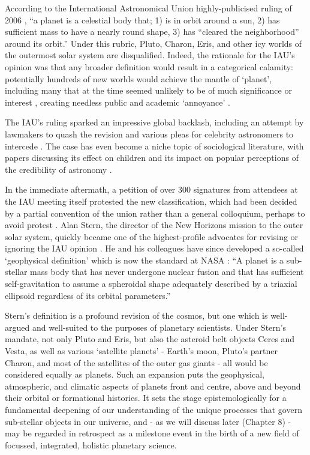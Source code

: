 \documentclass[a4paper,11pt,oneside]{book}
\begin{document}
According to the International Astronomical Union highly-publicised ruling of 2006 \cite{International_Astronomical_Union2006-ft}, ``a planet is a celestial body that; 1) is in orbit around a sun, 2) has sufficient mass to have a nearly round shape, 3) has ``cleared the neighborhood'' around its orbit.'' Under this rubric, Pluto, Charon, Eris, and other icy worlds of the outermost solar system are disqualified. Indeed, the rationale for the IAU's opinion was that any broader definition would result in a categorical calamity: potentially hundreds of new worlds would achieve the mantle of `planet', including many that at the time seemed unlikely to be of much significance or interest \cite{Sarma2008-wu}, creating needless public and academic `annoyance' \cite{Basri_2006} \cite{Basri2006-vw}.

The IAU's ruling sparked an impressive global backlash, including an attempt by lawmakers to quash the revision \cite{Zielinski2007-fv} and various pleas for celebrity astronomers to intercede \cite{Tyson2009-oe}. The case has even become a niche topic of sociological literature, with papers discussing its effect on children \citet{Jarman2009-ms, Broughton2013-wz} and its impact on popular perceptions of the credibility of astronomy \citet{Christensen2007-xw, Messeri2010-wo}.

In the immediate aftermath, a petition of over 300 signatures from attendees at the IAU meeting itself protested the new classification, which had been decided by a partial convention of the union rather than a general colloquium, perhaps to avoid protest \cite{Cartlidge2006-oe}. Alan Stern, the director of the New Horizons mission to the outer solar system, quickly became one of the highest-profile advocates for revising or ignoring the IAU opinion \cite{Hogan2006-aw}. He and his colleagues have since developed a so-called `geophysical definition' which is now the standard at NASA \cite{Runyon2017-rz}: ``A planet is a sub-stellar mass body that has never undergone nuclear fusion and that has sufficient self-gravitation to assume a spheroidal shape adequately described by a triaxial ellipsoid regardless of its orbital parameters.''

Stern's definition is a profound revision of the cosmos, but one which is well-argued and well-suited to the purposes of planetary scientists. Under Stern's mandate, not only Pluto and Eris, but also the asteroid belt objects Ceres and Vesta, as well as various `satellite planets' - Earth's moon, Pluto's partner Charon, and most of the satellites of the outer gas giants - all would be considered equally as planets. Such an expansion puts the geophysical, atmospheric, and climatic aspects of planets front and centre, above and beyond their orbital or formational histories. It sets the stage epistemologically for a fundamental deepening of our understanding of the unique processes that govern sub-stellar objects in our universe, and - as we will discuss later (Chapter 8) - may be regarded in retrospect as a milestone event in the birth of a new field of focussed, integrated, holistic planetary science.
\end{document}
